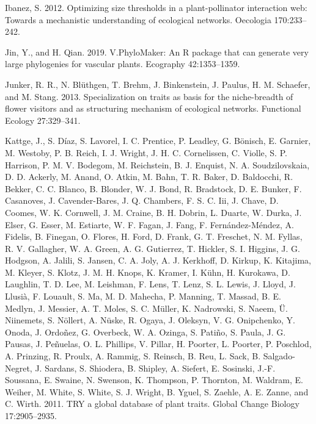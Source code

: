 \documentclass[11pt,a4paper,]{article}
\begin{document}
\hypertarget{ref-ibanez2012}{}
Ibanez, S. 2012. Optimizing size thresholds in a plant-pollinator
interaction web: Towards a mechanistic understanding of ecological
networks. Oecologia 170:233--242.

\hypertarget{ref-jin2019}{}
Jin, Y., and H. Qian. 2019. V.PhyloMaker: An R package that can generate
very large phylogenies for vascular plants. Ecography 42:1353--1359.

\hypertarget{ref-junker2013}{}
Junker, R. R., N. Blüthgen, T. Brehm, J. Binkenstein, J. Paulus, H. M.
Schaefer, and M. Stang. 2013. Specialization on traits as basis for the
niche-breadth of flower visitors and as structuring mechanism of
ecological networks. Functional Ecology 27:329--341.

\hypertarget{ref-kattge2011}{}
Kattge, J., S. Díaz, S. Lavorel, I. C. Prentice, P. Leadley, G. Bönisch,
E. Garnier, M. Westoby, P. B. Reich, I. J. Wright, J. H. C. Cornelissen,
C. Violle, S. P. Harrison, P. M. V. Bodegom, M. Reichstein, B. J.
Enquist, N. A. Soudzilovskaia, D. D. Ackerly, M. Anand, O. Atkin, M.
Bahn, T. R. Baker, D. Baldocchi, R. Bekker, C. C. Blanco, B. Blonder, W.
J. Bond, R. Bradstock, D. E. Bunker, F. Casanoves, J. Cavender-Bares, J.
Q. Chambers, F. S. C. Iii, J. Chave, D. Coomes, W. K. Cornwell, J. M.
Craine, B. H. Dobrin, L. Duarte, W. Durka, J. Elser, G. Esser, M.
Estiarte, W. F. Fagan, J. Fang, F. Fernández-Méndez, A. Fidelis, B.
Finegan, O. Flores, H. Ford, D. Frank, G. T. Freschet, N. M. Fyllas, R.
V. Gallagher, W. A. Green, A. G. Gutierrez, T. Hickler, S. I. Higgins,
J. G. Hodgson, A. Jalili, S. Jansen, C. A. Joly, A. J. Kerkhoff, D.
Kirkup, K. Kitajima, M. Kleyer, S. Klotz, J. M. H. Knops, K. Kramer, I.
Kühn, H. Kurokawa, D. Laughlin, T. D. Lee, M. Leishman, F. Lens, T.
Lenz, S. L. Lewis, J. Lloyd, J. Llusià, F. Louault, S. Ma, M. D.
Mahecha, P. Manning, T. Massad, B. E. Medlyn, J. Messier, A. T. Moles,
S. C. Müller, K. Nadrowski, S. Naeem, Ü. Niinemets, S. Nöllert, A.
Nüske, R. Ogaya, J. Oleksyn, V. G. Onipchenko, Y. Onoda, J. Ordoñez, G.
Overbeck, W. A. Ozinga, S. Patiño, S. Paula, J. G. Pausas, J. Peñuelas,
O. L. Phillips, V. Pillar, H. Poorter, L. Poorter, P. Poschlod, A.
Prinzing, R. Proulx, A. Rammig, S. Reinsch, B. Reu, L. Sack, B.
Salgado-Negret, J. Sardans, S. Shiodera, B. Shipley, A. Siefert, E.
Sosinski, J.-F. Soussana, E. Swaine, N. Swenson, K. Thompson, P.
Thornton, M. Waldram, E. Weiher, M. White, S. White, S. J. Wright, B.
Yguel, S. Zaehle, A. E. Zanne, and C. Wirth. 2011. TRY a global database
of plant traits. Global Change Biology 17:2905--2935.
\end{document}
